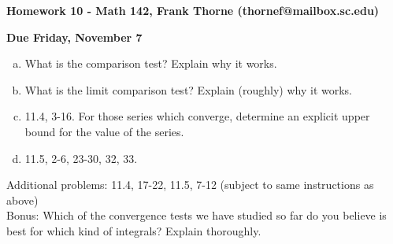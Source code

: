\documentclass[12pt]{article}
\begin{document}
\setlength{\topmargin}{-2mm}





\begin{center}{\bf Homework 10 - Math 142, Frank Thorne (thornef@mailbox.sc.edu)}
\end{center}
\begin{center}
{\bf Due Friday, November 7}
\end{center}

\begin{enumerate}[(a)]

\item
What is the comparison test? Explain why it works.

\item
What is the limit comparison test? Explain (roughly) why it works.

\item
11.4, 3-16. For those series which converge, determine an explicit upper bound for the value
of the series.

\item
11.5, 2-6, 23-30, 32, 33. 
\end{enumerate}
Additional problems: 11.4, 17-22, 11.5, 7-12 (subject to same instructions as above)
\\
Bonus: Which of the convergence tests we have studied so far do you believe is best for which
kind of integrals? Explain thoroughly.
\end{document}
